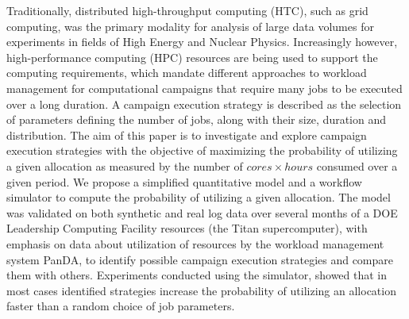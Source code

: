 Traditionally, distributed high-throughput  computing (HTC), such as grid
computing, was the primary modality for analysis of large data volumes for
experiments in fields of High Energy and Nuclear Physics.
Increasingly however, high-performance computing (HPC) resources are being
used to support the computing requirements, which mandate different
approaches to workload management for computational campaigns that require
many jobs to be executed over a long duration.
A campaign execution strategy is described as the selection of parameters
defining the number of jobs, along with their size, duration and distribution.
The aim of this paper is to investigate and explore campaign execution
strategies with the objective of maximizing the probability of utilizing a
given allocation as measured by the number of $cores \times hours$ consumed
over a given period.
We propose a simplified quantitative model and a workflow simulator to compute
the probability of utilizing a given allocation.
The model was validated on both synthetic and real log data over several 
months of a DOE Leadership Computing Facility resources (the Titan 
supercomputer), with emphasis on data about utilization of resources by 
the workload management system PanDA, to identify possible campaign 
execution strategies and compare them with others.
Experiments conducted using the simulator, showed that in most cases
identified strategies increase the probability of utilizing an allocation
faster than a random choice of job parameters.



